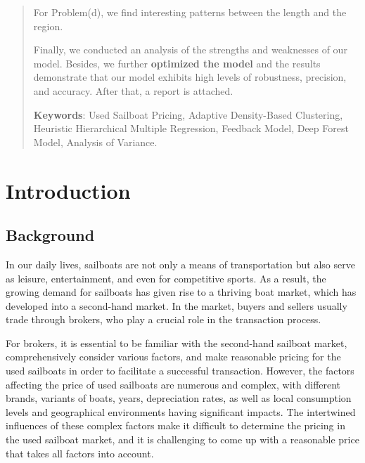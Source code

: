 \documentclass[12pt]{article}  %
\begin{document}
\begin{abstract}
    For Problem(d), we find interesting patterns between the length and the region.

    Finally, we conducted an analysis of the strengths and weaknesses of our model. Besides, we further \textbf{optimized the model} and the results demonstrate that our model exhibits high levels of robustness, precision, and accuracy. After that, a report is attached.




    \vspace{5pt}
    \textbf{Keywords}: Used Sailboat Pricing, Adaptive Density-Based Clustering, Heuristic Hierarchical Multiple Regression, Feedback Model, Deep Forest Model, Analysis of Variance.
 

\end{abstract}

\maketitle  %
\tableofcontents  %


\section{Introduction}
\subsection{Background}
In our daily lives, sailboats are not only a means of transportation but also serve as leisure, entertainment, and even for competitive sports. As a result, the growing demand for sailboats has given rise to a thriving boat market, which has developed into a second-hand market. In the market, buyers and sellers usually trade through brokers, who play a crucial role in the transaction process.

For brokers, it is essential to be familiar with the second-hand sailboat market, comprehensively consider various factors, and make reasonable pricing for the used sailboats in order to facilitate a successful transaction. However, the factors affecting the price of used sailboats are numerous and complex, with different brands, variants of boats, years, depreciation rates, as well as local consumption levels and geographical environments having significant impacts. The intertwined influences of these complex factors make it difficult to determine the pricing in the used sailboat market, and it is challenging to come up with a reasonable price that takes all factors into account.
\end{document}
